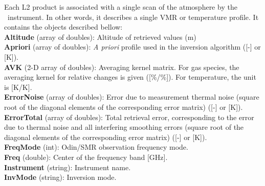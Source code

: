 Each L2 product is associated with a single scan of the atmosphere by the \smr\ instrument. In other words,
it describes a single VMR or temperature profile. It contains the objects described bellow: \\


\textbf{Altitude} (array of doubles): Altitude of retrieved values (m) \\

\textbf{Apriori} (array of doubles): \textit{A priori} profile used in the inversion algorithm ([-] or [K]). \\

\textbf{AVK} (2-D array of doubles): Averaging kernel matrix. For gas species, the averaging kernel for relative changes is given ([\%/\%]). For temperature, the unit is [K/K]. \\

\textbf{ErrorNoise} (array of doubles): Error due to measurement thermal noise (square root of the diagonal elements of the corresponding error matrix) ([-] or [K]). \\

\textbf{ErrorTotal} (array of doubles): Total retrieval error, corresponding to the error due to thermal noise and all interfering smoothing errors (square root of the diagonal elements of the corresponding error matrix) ([-] or [K]). \\

\textbf{FreqMode} (int): Odin/SMR observation frequency mode. \\ %

\textbf{Freq} (double): Center of the frequency band [GHz]. \\ %

\textbf{Instrument} (string): Instrument name. \\ %

\textbf{InvMode} (string): Inversion mode. \\ %

